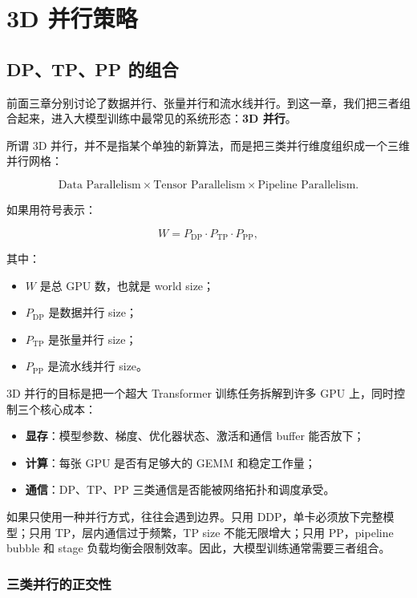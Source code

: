\chapter{3D 并行策略}
\label{chap:3d-parallelism}

\section{DP、TP、PP 的组合}
\label{sec:dp-tp-pp-composition}

前面三章分别讨论了数据并行、张量并行和流水线并行。到这一章，我们把三者组合起来，进入大模型训练中最常见的系统形态：\textbf{3D 并行}。

所谓 3D 并行，并不是指某个单独的新算法，而是把三类并行维度组织成一个三维并行网格：

\[
\text{Data Parallelism}
\times
\text{Tensor Parallelism}
\times
\text{Pipeline Parallelism}.
\]

如果用符号表示：

\[
W
=
P_{\mathrm{DP}}
\cdot
P_{\mathrm{TP}}
\cdot
P_{\mathrm{PP}},
\]

其中：

\begin{itemize}
\item $W$ 是总 GPU 数，也就是 world size；
\item $P_{\mathrm{DP}}$ 是数据并行 size；
\item $P_{\mathrm{TP}}$ 是张量并行 size；
\item $P_{\mathrm{PP}}$ 是流水线并行 size。
\end{itemize}

3D 并行的目标是把一个超大 Transformer 训练任务拆解到许多 GPU 上，同时控制三个核心成本：

\begin{itemize}
\item \textbf{显存}：模型参数、梯度、优化器状态、激活和通信 buffer 能否放下；
\item \textbf{计算}：每张 GPU 是否有足够大的 GEMM 和稳定工作量；
\item \textbf{通信}：DP、TP、PP 三类通信是否能被网络拓扑和调度承受。
\end{itemize}

如果只使用一种并行方式，往往会遇到边界。只用 DDP，单卡必须放下完整模型；只用 TP，层内通信过于频繁，TP size 不能无限增大；只用 PP，pipeline bubble 和 stage 负载均衡会限制效率。因此，大模型训练通常需要三者组合。

\subsection{三类并行的正交性}
\label{subsec:orthogonality-of-parallelism}

